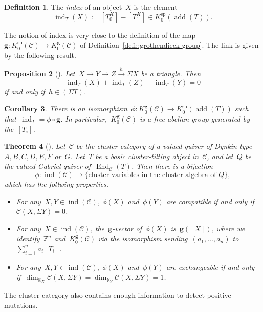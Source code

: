 \documentclass{amsart}
\newtheorem{theorem}{Theorem}[section]
\newtheorem{corollary}[theorem]{Corollary}
\newtheorem{proposition}[theorem]{Proposition}
\theoremstyle{definition}
\newtheorem{definition}[theorem]{Definition}
\newcommand{\Z}{\mathbb{Z}} %
\renewcommand{\b}[1]{{\boldsymbol{#1}}} %
\newcommand{\darkblue}{\color{darkblue}} %
\newcommand{\defn}[1]{\textsl{\darkblue #1}} %
\newcommand{\pg}[1]{\todo[color=green!30]{#1 \\ \hfill --- PG.}}
\newcommand{\field}{\mathbb{K}}
\newcommand{\cat}{\mathcal{C}}
\newcommand{\susp}{\Sigma}
\newcommand{\add}{\operatorname{add}}
\newcommand{\End}[1]{\operatorname{End}_{#1}}
\newcommand{\spl}{\operatorname{sp}}
\newcommand{\Ksp}{K_0^{\spl}}
\newcommand{\Kg}{K_0^{\b{g}}}
\newcommand{\ind}{\operatorname{ind}}
\newcommand{\CC}{\phi}
\begin{document}
\begin{definition}
 The \defn{index} of an object~$X$ is the element
 \[
  \ind_T(X) := [T_0^X] - [T_1^X] \in \Ksp(\add(T)).
 \]
\end{definition}

The notion of index is very close to the definition of the map~$\b g:\Ksp(\cat)\to \Kg(\cat)$ of Definition~\ref{defi::grothendieck-group}.  The link is given by the following result.

\begin{proposition}[\cite{Palu}]
 Let~$X\xrightarrow{} Y \xrightarrow{} Z \xrightarrow{h} \susp X$ be a triangle.
 Then
 \[
  \ind_T(X) + \ind_T(Z) - \ind_T(Y) = 0
 \]
 if and only if~$h\in (\susp T)$.
\end{proposition}

\begin{corollary}
 There is an isomorphism~$\phi:\Kg(\cat) \to \Ksp(\add(T))$ such that~$\ind_T = \phi\circ \b g$.  In particular,~$\Kg(\cat)$ is a free abelian group generated by the~$[T_i]$.
\end{corollary}

\begin{theorem}[]\pg{cite???}
 Let~$\cat$ be the cluster category of a valued quiver of Dynkin type~$A,B,C,D,E,F$ or~$G$.  Let~$T$ be a basic cluster-tilting object in~$\cat$, and let~$Q$ be the valued Gabriel quiver of~$\End{\cat}(T)$.  Then there is a bijection
 \[
  \CC: \ind(\cat) \xrightarrow{} \{\textrm{cluster variables in the cluster algebra of~$Q$}\},
 \]
 which has the follwing properties.
 \begin{itemize}
  \item For any~$X,Y\in \ind(\cat)$, $\CC(X)$ and~$\CC(Y)$ are compatible if and only if~$\cat(X, \susp Y) = 0$.
  \item For any~$X\in \ind(\cat)$, the~$\b g$-vector of~$\CC(X)$ is~$\b g([X])$, where we identify~$\Z^n$ and~$\Kg(\cat)$ via the isomorphism sending~$(a_1, \ldots, a_n)$ to~$\sum_{i=1}^n a_i [T_i]$.
  \item For any~$X,Y\in \ind(\cat)$, $\CC(X)$ and~$\CC(Y)$ are exchangeable if and only if~$\dim_{\field_X}\cat(X, \susp Y) = \dim_{\field_Y}\cat(X, \susp Y) = 1$.
 \end{itemize}
\end{theorem}

The cluster category also contains enough information to detect positive mutations.
\end{document}
